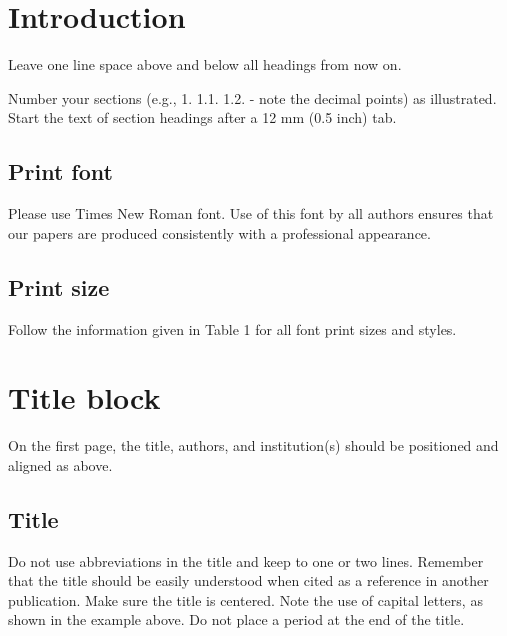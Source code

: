 \documentclass[twocolumn]{cinc}
\begin{document}
\section{Introduction}

Leave one line space above and below all headings from now on.

Number your sections (e.g., 1.  1.1.  1.2.  - note the decimal points) as
illustrated. Start the text of section headings after a 12 mm (0.5 inch)
tab.

% 

\subsection{Print font}

Please use Times New Roman font. Use of this font by all authors ensures
that our papers are produced consistently with a professional appearance.


 \subsection{ Print size}  

Follow the information given in Table 1 for all font print sizes and styles.

\section{Title block}
 
On the first page, the title, authors, and institution(s) should be
positioned and aligned as above.

\subsection{Title} 
 
Do not use abbreviations in the title and keep to one or two
lines. Remember that the title should be easily understood when cited as a
reference in another publication. Make sure the title is centered. Note the
use of capital letters, as shown in the example above. Do not place a
period at the end of the title.
\end{document}
